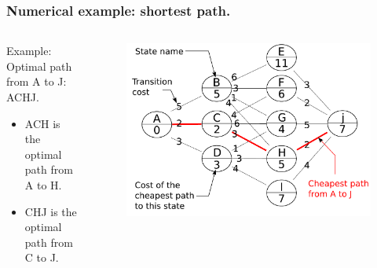 \documentclass[10pt,handout]{beamer}
\begin{document}
%
\begin{frame} \frametitle{Numerical example: shortest path.}
  \begin{columns}
    \begin{column}{0.4\textwidth}
      {\small Example:\\ Optimal path from A to J: ACHJ.
        \begin{itemize}
        \item ACH is the optimal path from A to H.
        \item CHJ is the optimal path from C to J.
        \end{itemize}}
    \end{column}
    
    \begin{column}{0.5\textwidth}
      
      \begin{figure}[H]
        \centering
        \includegraphics[width=\textwidth]{DPexample.pdf}
        \label{fig:DPexample}
      \end{figure}
    \end{column}
  \end{columns}
\end{frame}
\end{document}
